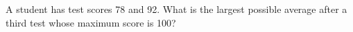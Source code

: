 A student has test scores 78 and 92. What is the largest possible average after a third test whose maximum score is 100?
